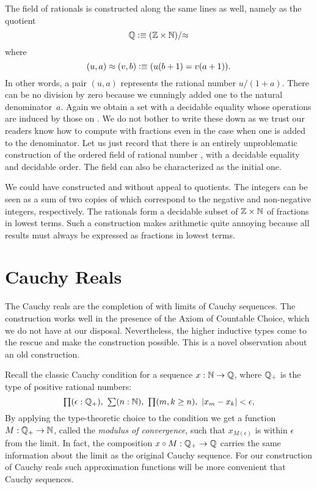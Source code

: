 The field of rationals \Q is constructed along the same lines as well, namely as the
quotient
%
\[ \mathbb{Q} \vcentcolon\equiv (\mathbb{Z} \times \mathbb{N})/{\approx} \]
%
where
\[ (u,a) \approx (v,b) \vcentcolon\equiv (u (b + 1) = v (a + 1)). \]
%
In other words, a pair $(u, a)$ represents the rational number $u / (1 + a)$. There can be
no division by zero because we cunningly added one to the natural denominator~$a$. Again
we obtain a set with a decidable equality whose operations are induced by those on \Z. We
do not bother to write these down as we trust our readers know how to compute with
fractions even in the case when one is added to the denominator. Let us just record that
there is an entirely unproblematic construction of the ordered field of rational number
\Q, with a decidable equality and decidable order. The field \Q can also be characterized
as the initial one.

\begin{rmk}
  We could have constructed \Z and \Q without appeal to quotients. The integers can be
  seen as a sum of two copies of \N which correspond to the negative and non-negative
  integers, respectively. The rationals form a decidable subset of $\mathbb{Z} \times \mathbb{N}$ of
  fractions in lowest terms. Such a construction makes arithmetic quite annoying because
  all results must always be expressed as fractions in lowest terms.
\end{rmk}


\section{Cauchy Reals}
\label{sec:cauchy-reals}

The Cauchy reals are the completion of \Q with limits of Cauchy sequences. The
construction works well in the presence of the Axiom of Countable Choice, which we do not
have at our disposal. Nevertheless, the higher inductive types come to the rescue and make
the construction possible. This is a novel observation about an old construction.

Recall the classic Cauchy condition for a sequence $x : \mathbb{N} \to \mathbb{Q}$, where $\mathbb{Q}_{+}$ is the
type of positive rational numbers:
%
\[ \prd{\epsilon : \Qp} \sm{n : \N} \prd{m, k \geq n} |x_m - x_k| < \epsilon, \]
%
By applying the type-theoretic choice to the condition we get a function $M : \mathbb{Q}_{+} \to \mathbb{N}$,
called the \emph{modulus of convergence}, such that $x_{M(\epsilon)}$ is within $\epsilon$
from the limit. In fact, the composition $x \circ M : \mathbb{Q}_{+} \to \mathbb{Q}$ carries the same
information about the limit as the original Cauchy sequence. For our construction of
Cauchy reals such approximation functions will be more convenient that Cauchy sequences.

